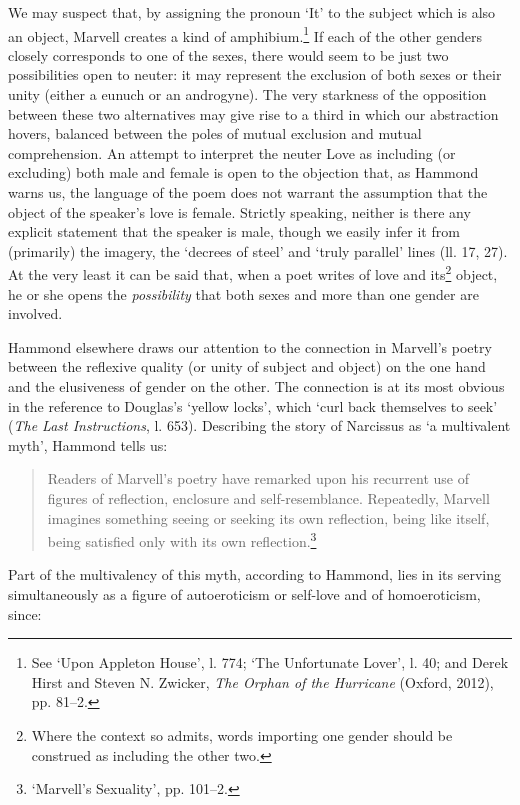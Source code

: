﻿\documentclass[12pt]{article}
\newcommand{\citedtitle}[1]{\textit{#1}}
\begin{document}
We may suspect that, by assigning the pronoun ‘It’ to the subject which is also an
object, Marvell creates a kind of amphibium.\footnote{See ‘Upon Appleton
House’, l. 774; ‘The Unfortunate Lover’, l. 40; and Derek Hirst and Steven N.
Zwicker, \citedtitle{The Orphan of the Hurricane} (Oxford, 2012), pp. 81–2.}
If each of the other genders closely corresponds to one of the sexes, there
would seem to be just two possibilities open to neuter: it may represent the
exclusion of both sexes or their unity (either a eunuch or an androgyne). The
very starkness of the opposition between these two alternatives may give rise
to a third in which our abstraction hovers, balanced between the poles of
mutual exclusion and mutual comprehension. An attempt to interpret the neuter
Love as including (or excluding) both male and female is open to the objection
that, as Hammond warns us, the language of the poem does not warrant the
assumption that the object of the speaker’s love is female. Strictly speaking,
neither is there any explicit statement that the speaker is male, though we
easily infer it from (primarily) the imagery, the ‘decrees of steel’ and ‘truly
parallel’ lines (ll. 17, 27). At the very least it can be said that, when a
poet writes of love and its\footnote{Where the context so
admits, words importing one gender should be construed as including the other
two.}
object, he or she opens the \emph{possibility} that both sexes and more than one
gender are involved.

Hammond
elsewhere draws our attention to the connection in Marvell’s poetry between the
reflexive quality (or unity of subject and object) on the one hand and the
elusiveness of gender on the other. The connection is at its most obvious in
the reference to Douglas’s ‘yellow locks’, which ‘curl back themselves to seek’
(\citedtitle{The Last Instructions},
l. 653). Describing the story of Narcissus as ‘a multivalent myth’, Hammond
tells us:

\begin{quote}
Readers of Marvell’s poetry have remarked upon his recurrent use of figures of reflection, enclosure and self-resemblance. Repeatedly, Marvell imagines something seeing or seeking its own reflection, being like itself, being satisfied only with its own reflection.\footnote{‘Marvell’s Sexuality’, pp. 101–2.}
\end{quote}

Part
of the multivalency of this myth, according to Hammond, lies in its serving
simultaneously as a figure of autoeroticism or self-love and of homoeroticism,
since:
\end{document}
